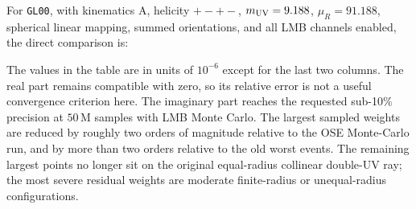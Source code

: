 \documentclass[11pt]{article}
\begin{document}
For \texttt{GL00}, with kinematics A, helicity $+ - + -$,
$m_{\rm UV}=9.188$, $\mu_R=91.188$, spherical linear mapping, summed
orientations, and all LMB channels enabled, the direct comparison is:
\begin{center}
\scriptsize
{}
\end{center}
The values in the table are in units of $10^{-6}$ except for the last two
columns.  The real part remains compatible with zero, so its relative error is
not a useful convergence criterion here.  The imaginary part reaches the
requested sub-10\% precision at $50\,\mathrm{M}$ samples with LMB Monte Carlo.
The largest sampled weights are reduced by roughly two orders of magnitude
relative to the OSE Monte-Carlo run, and by more than two orders relative to the
old worst events.  The remaining largest points no longer sit on the original
equal-radius collinear double-UV ray; the most severe residual weights are
moderate finite-radius or unequal-radius configurations.
\end{document}
